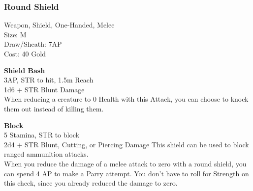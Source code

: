 \subsubsection{Round Shield}\label{weapon:roundShield}
Weapon, Shield, One-Handed, Melee\\
Size: M\\
Draw/Sheath: 7AP\\
Cost: 40 Gold

\textbf{Shield Bash}\\
3AP, STR to hit, 1.5m Reach\\
1d6 + \texttimes STR Blunt Damage\\
When reducing a creature to 0 Health with this Attack, you can choose to knock them out instead of killing them.

\textbf{Block}\\
5 Stamina, STR to block\\
2d4 + \texttimes STR Blunt, Cutting, or Piercing Damage
This shield can be used to block ranged ammunition attacks.\\
When you reduce the damage of a melee attack to zero with a round shield, you can spend 4 AP to make a Parry attempt.
You don't have to roll for Strength on this check, since you already reduced the damage to zero.\\
